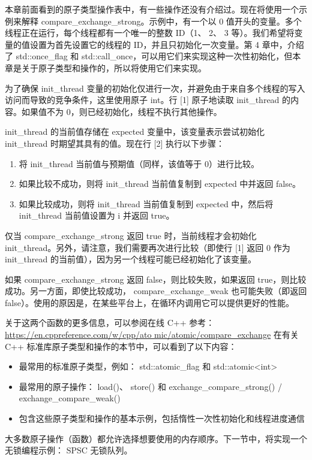 本章前面看到的原子类型操作表中，有一些操作还没有介绍过。现在将使用一个示例来解释 compare\_exchange\_strong。示例中，有一个以 0 值开头的变量。多个线程正在运行，每个线程都有一个唯一的整数 ID（1、 2、 3 等）。我们希望将变量的值设置为首先设置它的线程的 ID，并且只初始化一次变量。第 4 章中，介绍了 std::once\_flag 和 std::call\_once，可以用它们来实现这种一次性初始化，但本章是关于原子类型和操作的，所以将使用它们来实现。

为了确保 init\_thread 变量的初始化仅进行一次，并避免由于来自多个线程的写入访问而导致的竞争条件，这里使用原子 int。行 [1] 原子地读取 init\_thread 的内容。如果值不为 0，则已经初始化，线程不执行其他操作。

init\_thread 的当前值存储在 expected 变量中，该变量表示尝试初始化 init\_thread 时期望其具有的值。现在行 [2] 执行以下步骤：

\begin{enumerate}
\item
将 init\_thread 当前值与预期值（同样，该值等于 0）进行比较。

\item
如果比较不成功，则将 init\_thread 当前值复制到 expected 中并返回 false。

\item
如果比较成功，则将 init\_thread 当前值复制到 expected 中，然后将 init\_thread 当前值设置为 i 并返回 true。
\end{enumerate}

仅当 compare\_exchange\_strong 返回 true 时，当前线程才会初始化 init\_thread。另外，请注意，我们需要再次进行比较（即使行 [1] 返回 0 作为 init\_thread 的当前值），因为另一个线程可能已经初始化了该变量。

如果 compare\_exchange\_strong 返回 false，则比较失败，如果返回 true，则比较成功。另一方面，即使比较成功， compare\_exchange\_weak 也可能失败（即返回 false）。使用的原因是，在某些平台上，在循环内调用它可以提供更好的性能。

关于这两个函数的更多信息，可以参阅在线 C++ 参考： \url{https://en.cppreference.com/w/cpp/ato mic/atomic/compare_exchange} 在有关 C++ 标准库原子类型和操作的本节中，可以看到了以下内容：

\begin{itemize}
\item
最常用的标准原子类型，例如： std::atomic\_flag 和 std::atomic<int>

\item
最常用的原子操作： load()、 store() 和 exchange\_compare\_strong() / exchange\_compare\_weak()

\item
包含这些原子类型和操作的基本示例，包括惰性一次性初始化和线程进度通信
\end{itemize}

大多数原子操作（函数）都允许选择想要使用的内存顺序。下一节中，将实现一个无锁编程示例： SPSC 无锁队列。

